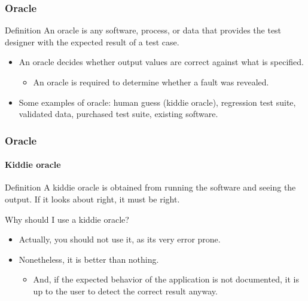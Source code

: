 \begin{frame}[parent={cmap:software-testing},hasnext=true,hasprev=true]
\label{concept:oracle}
\frametitle{Oracle}

\begin{block:concept}{Definition}
An oracle is any software, process, or data that provides the test designer
with the expected result of a test case.
\end{block:concept}

\begin{block:fact}{}
\begin{itemize}
	\item An oracle decides whether output values are correct against what is
	specified.
	\begin{itemize}
		\item An oracle is required to determine whether a fault was revealed.
	\end{itemize}

	\item Some examples of oracle: human guess (kiddie oracle), regression
	test suite, validated data, purchased test suite, existing software.
\end{itemize}
\end{block:fact}
\end{frame}



\begin{frame}
\label{concept:kiddie-oracle}
\frametitle{Oracle}
\framesubtitle{Kiddie oracle}

\begin{block:concept}{Definition}
A kiddie oracle is obtained from running the software and seeing the output. If
it looks about right, it must be right.
\end{block:concept}

\begin{block:fact}{Why should I use a kiddie oracle?}
\begin{itemize}
	\item Actually, you should not use it, as its very error prone.

	\item Nonetheless, it is better than nothing.
	\begin{itemize}
		\item And, if the expected behavior of the application is not
		documented, it is up to the user to detect the correct result anyway.
	\end{itemize}
\end{itemize}
\end{block:fact}


\hfill
{}
\end{frame}



